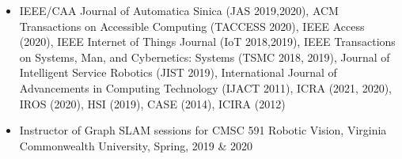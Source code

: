 
\begin{justify}
	\begin{itemize}[before=\fontsize{9pt}{1em}\bodyfontlight\upshape\color{text},leftmargin=3ex, nosep, noitemsep]
		\setlength{\parskip}{0pt}
		\renewcommand{\labelitemi}{\bullet}
		\item[] {IEEE/CAA Journal of Automatica Sinica (JAS 2019,2020), ACM Transactions on Accessible Computing (TACCESS 2020), IEEE Access (2020), IEEE Internet of Things Journal (IoT 2018,2019), IEEE Transactions on Systems, Man, and Cybernetics: Systems (TSMC 2018, 2019), Journal of Intelligent Service Robotics (JIST 2019), International Journal of Advancements in Computing Technology (IJACT 2011), ICRA (2021, 2020), IROS (2020), HSI (2019), CASE (2014), ICIRA (2012)}
	\end{itemize}
\end{justify}



\begin{justify}
	\begin{itemize}[before=\fontsize{9pt}{1em}\bodyfontlight\upshape\color{text},leftmargin=3ex, nosep, noitemsep]
		\setlength{\parskip}{0pt}
		\renewcommand{\labelitemi}{\bullet}
		\item[] {Instructor of Graph SLAM sessions for CMSC 591 Robotic Vision, Virginia Commonwealth University, Spring, 2019 \& 2020}
	\end{itemize}
\end{justify}




